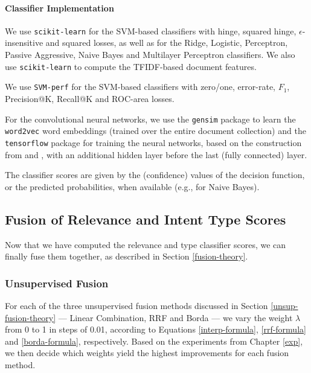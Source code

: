 \paragraph{Classifier Implementation}
We use \texttt{scikit-learn} \cite{scikit} for the SVM-based classifiers with hinge,
squared hinge, $\epsilon$-insensitive and squared losses, as well as for the Ridge, Logistic, Perceptron,
Passive Aggressive, Naive Bayes and Multilayer Perceptron classifiers.
We also use \texttt{scikit-learn} to compute the TFIDF-based document features.

We use \texttt{SVM-perf} \cite{svmperf3,svmperf1,svmperf2}
for the SVM-based classifiers with zero/one, error-rate, $F_1$, Precision@K, Recall@K and ROC-area losses.

For the convolutional neural networks, we use the \texttt{gensim} package \cite{gensim} to learn the \texttt{word2vec}
word embeddings (trained over the entire document collection)
and the \texttt{tensorflow} package \cite{tf} for training the neural networks, based on the construction
from \cite{cnn} and \cite{cnn-code}, with an additional hidden layer before the last (fully connected) layer.

The classifier scores are given by the (confidence) values of the decision function, or the predicted probabilities,
when available (e.g., for Naive Bayes).

\subsection{Fusion of Relevance and Intent Type Scores}
Now that we have computed the relevance and type classifier scores, we can finally fuse them together,
as described in Section \ref{fusion-theory}.

\subsubsection{Unsupervised Fusion}\label{impl-unsup}
For each of the three unsupervised fusion methods discussed in Section \ref{unsup-fusion-theory}
--- Linear Combination, RRF and Borda --- we vary the weight $\lambda$ from 0 to 1 in steps of 0.01,
according to Equations \ref{interp-formula}, \ref{rrf-formula} and \ref{borda-formula}, respectively.
Based on the experiments from Chapter \ref{exp}, we then decide
which weights yield the highest improvements for each fusion method.

